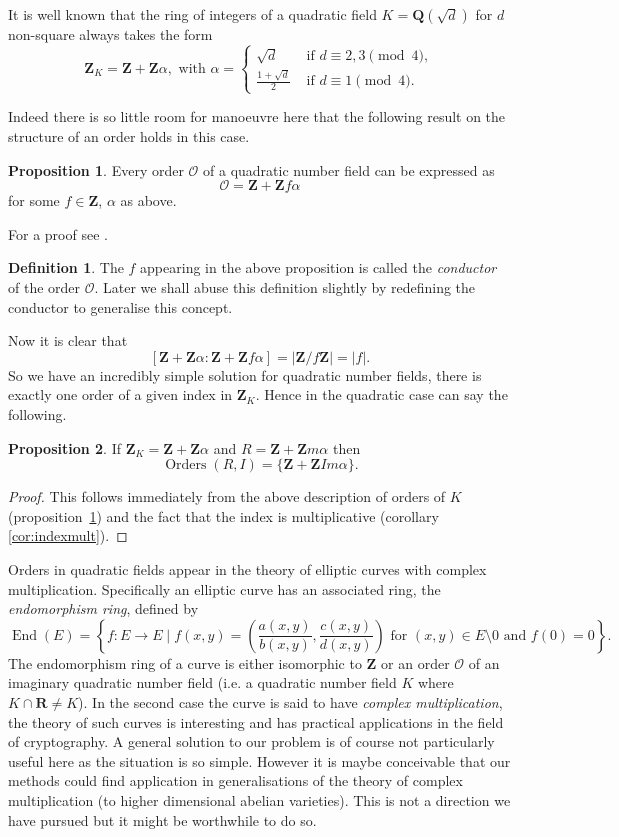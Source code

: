 \documentclass[12pt,a4paper,abstracton,bibtotoc]{scrreprt}
\theoremstyle{definition}
\newtheorem{prop}{Proposition}
\newtheorem{defn}{Definition}
\newcommand{\QQ}{\mathbf{Q}}
\newcommand{\RR}{\mathbf{R}}
\newcommand{\ZZ}{\mathbf{Z}}
\renewcommand{\O}{\mathcal{O}}
\DeclareMathOperator{\Orders}{Orders}
\DeclareMathOperator{\End}{End}
\begin{document}
It is well known \cite{lang} that the ring of integers of a quadratic field $K = \QQ(\sqrt{d})$ for $d$ non-square always takes the form
\[\ZZ_K = \ZZ + \ZZ\alpha,\text{ with } \alpha =\begin{cases}
\sqrt{d}&\text{ if $d\equiv 2,3\pmod{4}$},\\
\frac{1+\sqrt{d}}{2}&\text{ if $d\equiv 1\pmod{4}$}.
\end{cases}\]

Indeed there is so little room for manoeuvre here that the following result on the structure of an order holds in this case.

\begin{prop}
\label{prop:quadord}
Every order $\O$ of a quadratic number field can be expressed as
\[\O = \ZZ + \ZZ f\alpha\]
for some $f\in \ZZ$, $\alpha$ as above.
\end{prop}

For a proof see \cite[pp. 133--134]{cox}.

\begin{defn}
The $f$ appearing in the above proposition is called the \emph{conductor} of the order $\O$.
Later we shall abuse this definition slightly by redefining the conductor to generalise this concept.
\end{defn}

Now it is clear that
\[
[\ZZ + \ZZ\alpha : \ZZ + \ZZ f \alpha] = |\ZZ/f\ZZ| = |f|.
\]
So we have an incredibly simple solution for quadratic number fields, there is exactly one order of a given index in $\ZZ_K$.
Hence in the quadratic case can say the following.

\begin{prop}
If $\ZZ_K = \ZZ + \ZZ\alpha$ and $R = \ZZ + \ZZ m\alpha$ then
\[
\Orders(R, I) = \{\ZZ + \ZZ Im\alpha\}.
\]
\end{prop}
\begin{proof}
This follows immediately from the above description of orders of $K$ (proposition~\ref{prop:quadord}) and the fact that the index is multiplicative (corollary \ref{cor:indexmult}).
\end{proof}

Orders in quadratic fields appear in the theory of elliptic curves with complex multiplication.
Specifically an elliptic curve has an associated ring, the \emph{endomorphism ring}, defined by
\[
\End(E) = \left\{ f\colon E \to E \mid f(x,y) = (\frac{a(x,y)}{b(x,y)},\frac{c(x,y)}{d(x,y)}) \text{ for } (x,y) \in E\setminus 0 \text{ and } f(0) = 0\right\}. %
\]
The endomorphism ring of a curve is either isomorphic to $\ZZ$ or an order $\O$ of an imaginary quadratic number field (i.e. a quadratic number field $K$ where $K\cap \RR \ne K$).
In the second case the curve is said to have \emph{complex multiplication}, the theory of such curves is interesting and has practical applications in the field of cryptography.
A general solution to our problem is of course not particularly useful here as the situation is so simple.
However it is maybe conceivable that our methods could find application in generalisations of the theory of complex multiplication (to higher dimensional abelian varieties).
This is not a direction we have pursued but it might be worthwhile to do so.
\end{document}
